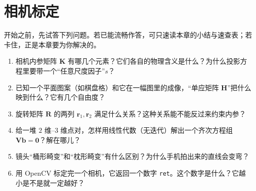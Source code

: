 \chapter{相机标定}
\label{ch:calib}


\begin{practice}[前置自测]
开始之前，先试答下列问题。若已能流畅作答，可只速读本章的小结与速查表；若卡住，正是本章要为你解决的。
\begin{enumerate}
  \item 相机内参矩阵 $\mathbf{K}$ 有哪几个元素？它们各自的物理含义是什么？为什么投影方程里要带一个“任意尺度因子”$s$？
  \item 已知一个平面图案（如棋盘格）和它在一幅图里的成像，“单应矩阵 $\mathbf{H}$”把什么映到什么？它有几个自由度？
  \item 旋转矩阵 $\mathbf{R}$ 的两列 $\mathbf{r}_1,\mathbf{r}_2$ 满足什么关系？这种关系能不能反过来约束内参？
  \item 给一堆 $2$ 维–$3$ 维点对，怎样用线性代数（无迭代）解出一个齐次方程组 $\mathbf{V}\mathbf{b}=\mathbf{0}$？解在哪儿？
  \item 镜头“桶形畸变”和“枕形畸变”有什么区别？为什么手机拍出来的直线会变弯？
  \item 用 OpenCV 标定完一个相机，它返回一个数字 \texttt{ret}。这个数字是什么？它越小是不是就一定越好？
\end{enumerate}
\end{practice}

